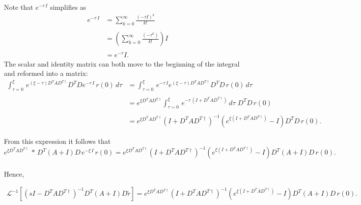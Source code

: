 Note that $e^{-\tau \, I}$ simplifies as 
\begin{align*}
e^{-\tau \, I}
&=
\sum_{k=0}^{\infty}
\frac{\left(-\tau I\right)^{k}}{k!}
%
\\
\\
%
&=
\left(
	\sum_{k=0}^{\infty}
	\frac{(-\tau^{k})}{k!}
\right) I
%
\\
\\
%
&= e^{-\tau} I.
\end{align*}
The scalar and identity matrix can both move to the beginning of the integral and reformed into a matrix:
\begin{align*}
	\int_{\tau=0}^{\xi} \,
		e^{ \left(\xi-\tau\right) D^T A D^{T \dagger}}
		D^T D e^{-\tau \, I} \, r(0)
	\, d\tau
	&= 
	\int_{\tau=0}^{\xi} \,
		e^{-\tau \, I}
		e^{ \left(\xi-\tau\right) D^T A D^{T \dagger}}
		D^T D \, r(0)
	\, d\tau
	\\
	\\
	&=
	e^{\xi D^T A D^{T \dagger}}
	\int_{\tau=0}^{\xi} \,
		e^
		{
			-\tau \, \left( I + D^T A D^{T \dagger} \right)
		}
	\, d\tau
	\, \,
	D^T D \, r(0)
	\\
	\\
	&=
	e^{\xi D^T A D^{T \dagger}}
	\left( I + D^T A D^{T \dagger} \right)^{-1}
	\left(
		e^{\xi \left( I + D^T A D^{T \dagger} \right)} - I
	\right)
	D^T D \, r(0).
\end{align*}

From this expression it follows that 
\\
$$
	e^{\xi D^T A D^{T \dagger}}
	\, 
	*	
	\,
		D^T 
		\left(
			A + I
		\right)	
		D \, 
		e^{-\xi \, I} \, r(0)
	=
		e^{\xi D^T A D^{T \dagger}}
	\left( I + D^T A D^{T \dagger} \right)^{-1}
	\left(
		e^{\xi \left( I + D^T A D^{T \dagger} \right)} - I
	\right)
	D^T(A + I)D \, r(0).	
$$
\\
Hence, 

\begin{align}
\label{eq:analysis:comparison_sc_vs_pcf_vs_gj:gj_voltage_intermittent_laplace_transformed_term_1}
\mathcal{L}^{-1}
	\left[
		\left(
			sI - D^T A D^{T \dagger}
		\right)^{-1}
		D^T 
		\left(
			A + I
		\right)	
		D \tilde{r}
	\right]
	=
	e^{\xi D^T A D^{T \dagger}}
	\left( I + D^T A D^{T \dagger} \right)^{-1}
	\left(
		e^{\xi \left( I + D^T A D^{T \dagger} \right)} - I
	\right)
	D^T(A + I)D \, r(0).	
\end{align}

